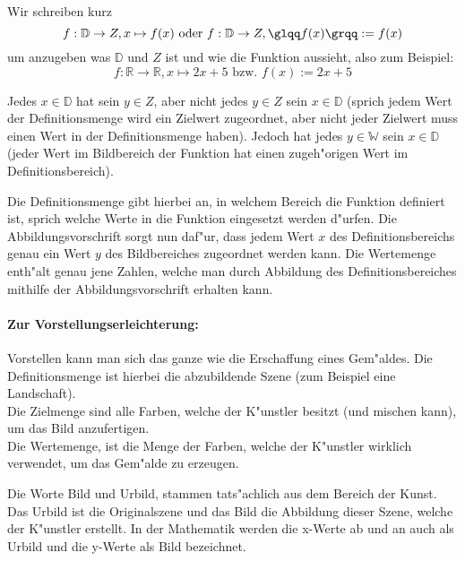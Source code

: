\begin{flushleft}
Wir schreiben kurz
\begin{equation*}
f : \mathbb{D} \to Z, x \mapsto f(x) \text{ oder } f : \mathbb{D} \to Z, \text{\glqq}f(x)\text{\grqq} := f(x)
\end{equation*}
um anzugeben was $\mathbb{D}$ und $Z$ ist und wie die Funktion aussieht, also zum Beispiel:
\begin{equation*}
f :\mathbb{R} \to \mathbb{R}, x \mapsto 2x + 5 \text{ bzw. } f(x) := 2x + 5
\end{equation*}
\begin{warning}Jedes $x \in \mathbb{D}$ hat sein $y \in Z$, aber nicht jedes $y \in Z$ sein $x \in \mathbb{D}$ (sprich jedem Wert der Definitionsmenge wird ein Zielwert zugeordnet, aber nicht jeder Zielwert muss einen Wert in der Definitionsmenge haben). Jedoch hat jedes $y \in \mathbb{W}$ sein $x \in \mathbb{D}$ (jeder Wert im Bildbereich der Funktion hat einen zugeh"origen Wert im Definitionsbereich).
\end{warning}
Die Definitions\-menge gibt hierbei an, in welchem Bereich die Funktion definiert ist, sprich welche Werte \glqq in die Funktion eingesetzt werden d"urfen\grqq . Die Abbildungs\-vorschrift sorgt nun daf"ur, dass jedem Wert $x$ des Definitions\-bereichs genau ein Wert $y$ des Bild\-bereiches zugeordnet werden kann. Die Wertemenge enth"alt genau jene Zahlen, welche man durch Abbildung des Definitions\-bereiches mithilfe der Abbildungs\-vorschrift erhalten kann.

\paragraph{Zur Vorstellungserleichterung:}
Vorstellen kann man sich das ganze wie die Erschaffung eines Gem"aldes. Die Definitionsmenge ist hierbei die abzubildende Szene (zum Beispiel eine Landschaft).\\
Die Zielmenge sind alle Farben, welche der K"unstler besitzt (und mischen kann), um das Bild anzufertigen.\\
Die Wertemenge, ist die Menge der Farben, welche der K"unstler wirklich verwendet, um das Gem"alde zu erzeugen.

\begin{warning}
	Die Worte Bild und Urbild, stammen tats"achlich aus dem Bereich der Kunst. Das Urbild ist die Originalszene und das Bild die Abbildung dieser Szene, welche der K"unstler erstellt. In der Mathematik werden die x-Werte ab und an auch als Urbild und die y-Werte als Bild bezeichnet.
\end{warning}


\end{flushleft}
